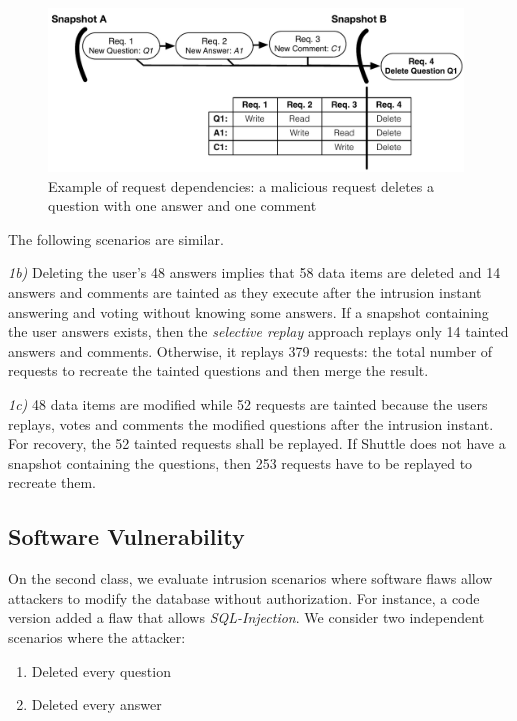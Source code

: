 \begin{figure}
  \centering
  \includegraphics[width=110mm]{images/attack_1_graph}
  \caption[Example of request dependencies]{Example of request dependencies: a malicious request deletes a question with one answer and one comment}
  \label{fig:attack_1_graph}
\end{figure}

The following scenarios are similar.

\textit{1b)} Deleting the user's 48 answers implies that 58 data items are deleted and 14 answers and comments are tainted as they execute after the intrusion instant answering and voting without knowing some answers. If a snapshot containing the user answers exists, then the \textit{selective replay} approach replays only 14 tainted answers and comments. Otherwise, it replays 379 requests: the total number of requests to recreate the tainted questions and then merge the result.

\textit{1c)} 48 data items are modified while 52 requests are tainted because the users replays, votes and comments the modified questions after the intrusion instant. For recovery, the 52 tainted requests shall be replayed. If Shuttle does not have a snapshot containing the questions, then 253 requests have to be replayed to recreate them. 



\subsection{Software Vulnerability}\label{sec:eval:accuracy:software}
On the second class, we evaluate intrusion scenarios where software flaws allow attackers to modify the database without authorization. For instance, a code version added a flaw that allows \emph{SQL-Injection}. We consider two independent scenarios where the attacker:

\begin{enumerate}[label=\alph*]
  \item Deleted every question
  \item Deleted every answer
\end{enumerate}


